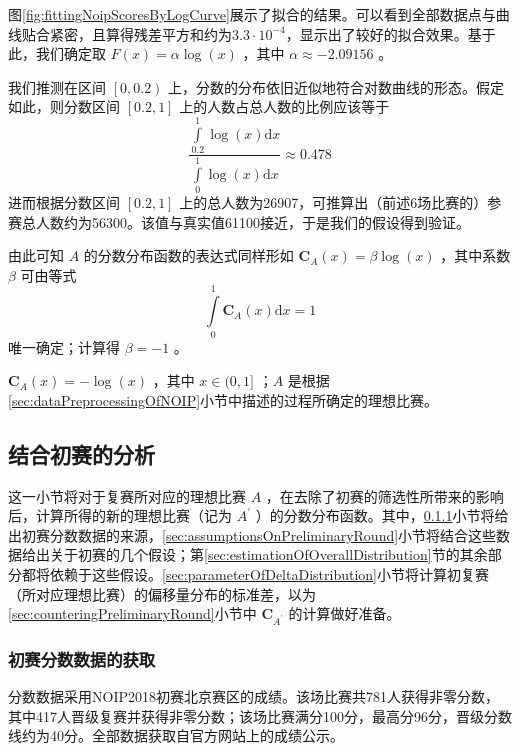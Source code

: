         图\ref{fig:fittingNoipScoresByLogCurve}展示了拟合的结果。可以看到全部数据点与曲线贴合紧密，且算得残差平方和约为$3.3\cdot 10^{-4}$，显示出了较好的拟合效果。基于此，我们确定取 $F(x)=\alpha\log(x)$ ，其中 $\alpha\approx-2.09156$ 。

        我们推测在区间 $\left[0,0.2\right)$ 上，分数的分布依旧近似地符合对数曲线的形态。假定如此，则分数区间 $[0.2,1]$ 上的人数占总人数的比例应该等于 $$\dfrac{\displaystyle\int\limits_{0.2}^1 \log(x)\mathrm{d}x}{\displaystyle\int\limits_0^1 \log(x)\mathrm{d}x}\approx 0.478$$ 进而根据分数区间 $[0.2,1]$ 上的总人数为26907，可推算出（前述6场比赛的）参赛总人数约为56300。该值与真实值61100接近，于是我们的假设得到验证。

        由此可知 $A$ 的分数分布函数的表达式同样形如 $\bm{C}_A(x)=\beta\log(x)$ ，其中系数 $\beta$ 可由等式 $$\int\limits_0^1 \bm{C}_A(x)\mathrm{d}x=1$$ 唯一确定；计算得 $\beta=-1$ 。

        \begin{proposition}
            $\bm{C}_A(x)=-\log(x)$ ，其中 $x\in(0,1]$ ；$A$ 是根据\ref{sec:dataPreprocessingOfNOIP}小节中描述的过程所确定的理想比赛。
            \label{prop:scoreDistributionOfStandardizedNoip}
        \end{proposition}
            
    \subsection{结合初赛的分析}\label{sec:analysisOfBothRounds}

        这一小节将对于复赛所对应的理想比赛 $A$ ，在去除了初赛的筛选性所带来的影响后，计算所得的新的理想比赛（记为 $A^\prime$ ）的分数分布函数。其中，\ref{sec:dataOfPreliminaryRound}小节将给出初赛分数数据的来源，\ref{sec:assumptionsOnPreliminaryRound}小节将结合这些数据给出关于初赛的几个假设；第\ref{sec:estimationOfOverallDistribution}节的其余部分都将依赖于这些假设。\ref{sec:parameterOfDeltaDistribution}小节将计算初复赛（所对应理想比赛）的偏移量分布的标准差，以为\ref{sec:counteringPreliminaryRound}小节中 $\bm{C}_{A^\prime}$ 的计算做好准备。

        \subsubsection{初赛分数数据的获取}\label{sec:dataOfPreliminaryRound}

            分数数据采用NOIP2018初赛北京赛区的成绩。该场比赛共781人获得非零分数，其中417人晋级复赛并获得非零分数；该场比赛满分100分，最高分96分，晋级分数线约为40分。全部数据获取自官方网站上的成绩公示。

